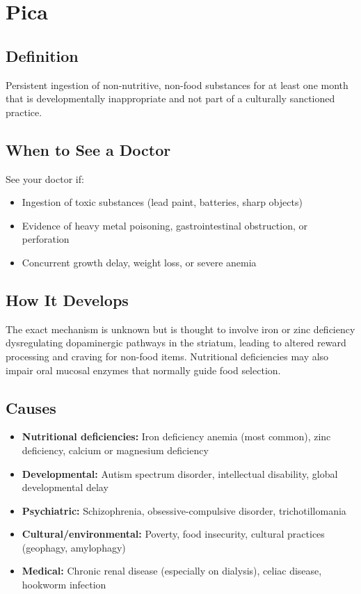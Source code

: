 \chapter{Pica}

\section*{Definition}
Persistent ingestion of non-nutritive, non-food substances for at least one month that is developmentally inappropriate and not part of a culturally sanctioned practice.

\section*{When to See a Doctor}
See your doctor if:
\begin{itemize}
  \item Ingestion of toxic substances (lead paint, batteries, sharp objects)
  \item Evidence of heavy metal poisoning, gastrointestinal obstruction, or perforation
  \item Concurrent growth delay, weight loss, or severe anemia
\end{itemize}

\section*{How It Develops}
The exact mechanism is unknown but is thought to involve iron or zinc deficiency dysregulating dopaminergic pathways in the striatum, leading to altered reward processing and craving for non-food items. Nutritional deficiencies may also impair oral mucosal enzymes that normally guide food selection.

\section*{Causes}
\begin{itemize}
  \item \textbf{Nutritional deficiencies:} Iron deficiency anemia (most common), zinc deficiency, calcium or magnesium deficiency
  \item \textbf{Developmental:} Autism spectrum disorder, intellectual disability, global developmental delay
  \item \textbf{Psychiatric:} Schizophrenia, obsessive-compulsive disorder, trichotillomania
  \item \textbf{Cultural/environmental:} Poverty, food insecurity, cultural practices (geophagy, amylophagy)
  \item \textbf{Medical:} Chronic renal disease (especially on dialysis), celiac disease, hookworm infection
\end{itemize}

